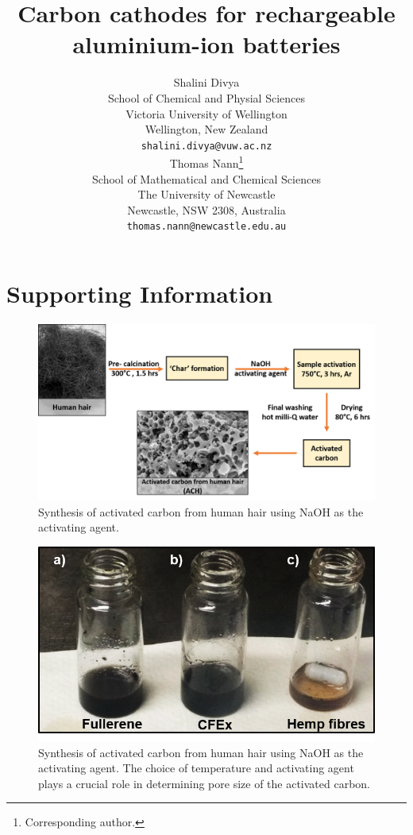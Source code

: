 \documentclass{article}
\title{Carbon cathodes for rechargeable aluminium-ion batteries}
\author{
Shalini Divya\\
  School of Chemical and Physial Sciences\\
  Victoria University of Wellington\\
  Wellington, New Zealand\\
  \texttt{shalini.divya@vuw.ac.nz}\\
   \And
  Thomas Nann\thanks{Corresponding author.}\\
  School of Mathematical and Chemical Sciences\\
  The University of Newcastle\\
  Newcastle, NSW 2308, Australia\\
  \texttt{thomas.nann@newcastle.edu.au}\\
}
\begin{document}
\maketitle
\section*{Supporting Information}
\newcommand{\beginsupplement}{
               \setcounter{figure}{0}
        \renewcommand{\thefigure}{S\arabic{figure}}
     }
\beginsupplement


\begin{figure}[ht!]
\centering
\includegraphics[width=\textwidth]{fig/ACHsyn}
\caption{Synthesis of activated carbon from human hair using NaOH as the activating agent.}
\label{fig:ACHsyn}
\end{figure}

\begin{figure}[th!]
\centering
\includegraphics[width=\textwidth]{fig/CFExsol}
\caption{Synthesis of activated carbon from human hair using NaOH as the activating agent. The choice of temperature and activating agent plays a crucial role in determining pore size of the activated carbon.}
\label{fig:CFExsol}
\end{figure}
\end{document}
